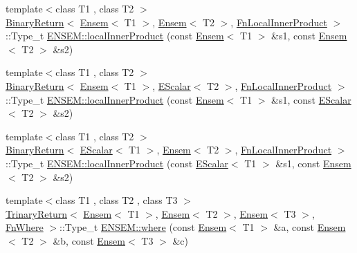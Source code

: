 \begin{DoxyCompactItemize}
{\footnotesize template$<$class T1 , class T2 $>$ }\\\mbox{\hyperlink{structENSEM_1_1BinaryReturn}{Binary\+Return}}$<$ \mbox{\hyperlink{classENSEM_1_1Ensem}{Ensem}}$<$ T1 $>$, \mbox{\hyperlink{classENSEM_1_1Ensem}{Ensem}}$<$ T2 $>$, \mbox{\hyperlink{structENSEM_1_1FnLocalInnerProduct}{Fn\+Local\+Inner\+Product}} $>$\+::Type\+\_\+t \mbox{\hyperlink{group__eensem_ga5f487a5a9eb850aeb6bbd0375d54615c}{E\+N\+S\+E\+M\+::local\+Inner\+Product}} (const \mbox{\hyperlink{classENSEM_1_1Ensem}{Ensem}}$<$ T1 $>$ \&s1, const \mbox{\hyperlink{classENSEM_1_1Ensem}{Ensem}}$<$ T2 $>$ \&s2)
\item 
{\footnotesize template$<$class T1 , class T2 $>$ }\\\mbox{\hyperlink{structENSEM_1_1BinaryReturn}{Binary\+Return}}$<$ \mbox{\hyperlink{classENSEM_1_1Ensem}{Ensem}}$<$ T1 $>$, \mbox{\hyperlink{classENSEM_1_1EScalar}{E\+Scalar}}$<$ T2 $>$, \mbox{\hyperlink{structENSEM_1_1FnLocalInnerProduct}{Fn\+Local\+Inner\+Product}} $>$\+::Type\+\_\+t \mbox{\hyperlink{group__eensem_gabc088ed28b376f4b542a0fcd1337b609}{E\+N\+S\+E\+M\+::local\+Inner\+Product}} (const \mbox{\hyperlink{classENSEM_1_1Ensem}{Ensem}}$<$ T1 $>$ \&s1, const \mbox{\hyperlink{classENSEM_1_1EScalar}{E\+Scalar}}$<$ T2 $>$ \&s2)
\item 
{\footnotesize template$<$class T1 , class T2 $>$ }\\\mbox{\hyperlink{structENSEM_1_1BinaryReturn}{Binary\+Return}}$<$ \mbox{\hyperlink{classENSEM_1_1EScalar}{E\+Scalar}}$<$ T1 $>$, \mbox{\hyperlink{classENSEM_1_1Ensem}{Ensem}}$<$ T2 $>$, \mbox{\hyperlink{structENSEM_1_1FnLocalInnerProduct}{Fn\+Local\+Inner\+Product}} $>$\+::Type\+\_\+t \mbox{\hyperlink{group__eensem_gad3fbed60bbedae0c1abcbdbfc4bbcc0a}{E\+N\+S\+E\+M\+::local\+Inner\+Product}} (const \mbox{\hyperlink{classENSEM_1_1EScalar}{E\+Scalar}}$<$ T1 $>$ \&s1, const \mbox{\hyperlink{classENSEM_1_1Ensem}{Ensem}}$<$ T2 $>$ \&s2)
\item 
{\footnotesize template$<$class T1 , class T2 , class T3 $>$ }\\\mbox{\hyperlink{structENSEM_1_1TrinaryReturn}{Trinary\+Return}}$<$ \mbox{\hyperlink{classENSEM_1_1Ensem}{Ensem}}$<$ T1 $>$, \mbox{\hyperlink{classENSEM_1_1Ensem}{Ensem}}$<$ T2 $>$, \mbox{\hyperlink{classENSEM_1_1Ensem}{Ensem}}$<$ T3 $>$, \mbox{\hyperlink{structENSEM_1_1FnWhere}{Fn\+Where}} $>$\+::Type\+\_\+t \mbox{\hyperlink{group__eensem_gac55277f43f9b655a1ae7d4599568d633}{E\+N\+S\+E\+M\+::where}} (const \mbox{\hyperlink{classENSEM_1_1Ensem}{Ensem}}$<$ T1 $>$ \&a, const \mbox{\hyperlink{classENSEM_1_1Ensem}{Ensem}}$<$ T2 $>$ \&b, const \mbox{\hyperlink{classENSEM_1_1Ensem}{Ensem}}$<$ T3 $>$ \&c)

\end{DoxyCompactItemize}
